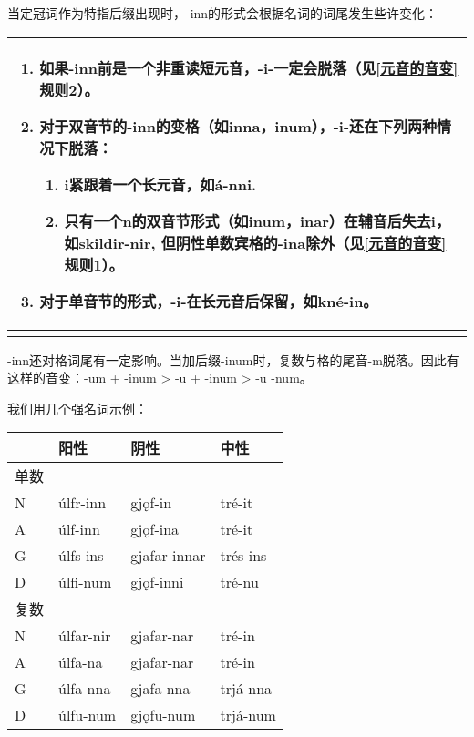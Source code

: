 当定冠词作为特指后缀出现时，-inn的形式会根据名词的词尾发生些许变化：

\begin{longtable}{l}
  \toprule
  \begin{enumerate}\def\labelenumi{\arabic{enumi})}\item  如果-inn前是一个非重读短元音，-i-一定会脱落（见\ref{元音的音变}规则2）。\item  对于双音节的-inn的变格（如inna，inum），-i-还在下列两种情况下脱落：  \begin{enumerate}  \def\labelenumii{\roman{enumii}.}  \item    i紧跟着一个长元音，如á-nni.  \item    只有一个n的双音节形式（如inum，inar）在辅音后失去i，如skildir-nir,    但阴性单数宾格的-ina除外（见\ref{元音的音变}规则1）。  \end{enumerate}\item  对于单音节的形式，-i-在长元音后保留，如kné-in。\end{enumerate} \\
  \midrule
  \endhead
  \bottomrule
  \endfoot
\end{longtable}

-inn还对格词尾有一定影响。当加后缀-inum时，复数与格的尾音-m脱落。因此有这样的音变：-um
+ -inum \textgreater{} -u + -inum \textgreater{} -u -num。

我们用几个强名词示例：

\begin{longtable}{llll}
  \toprule
     & 阳性        & 阴性           & 中性       \\
  \midrule
  \endhead
  \bottomrule
  \endfoot
  单数 &           &              &          \\
  N  & úlfr-inn  & gjǫf-in      & tré-it   \\
  A  & úlf-inn   & gjǫf-ina     & tré-it   \\
  G  & úlfs-ins  & gjafar-innar & trés-ins \\
  D  & úlfi-num  & gjǫf-inni    & tré-nu   \\
  复数 &           &              &          \\
  N  & úlfar-nir & gjafar-nar   & tré-in   \\
  A  & úlfa-na   & gjafar-nar   & tré-in   \\
  G  & úlfa-nna  & gjafa-nna    & trjá-nna \\
  D  & úlfu-num  & gjǫfu-num    & trjá-num \\
\end{longtable}

